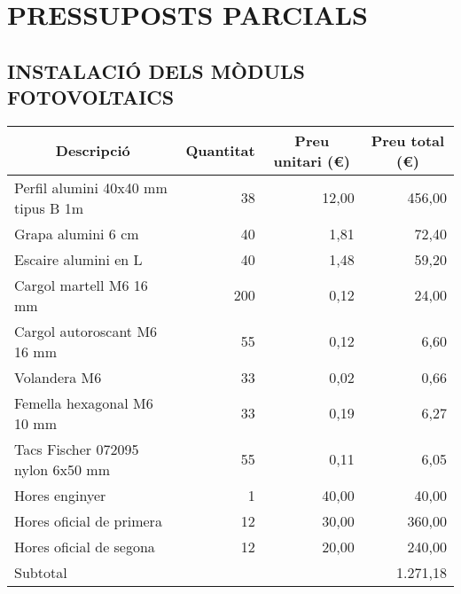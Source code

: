 \chapter{\uppercase{Pressuposts parcials}}

\section{\uppercase{Instal\Lgem ació dels mòduls fotovoltaics}}
\begin{table}[H]
  \begin{center}
    \begin{tabularx} {\textwidth} {|X|r|r|r|} \hline
  \multicolumn{1}{|c|}{Descripció} &  \multicolumn{1}{c|}{Quantitat} & \multicolumn{1}{c|}{Preu unitari (€)} &  \multicolumn{1}{c|}{Preu total (€)}\\ \hline \hline
    Perfil alumini 40x40 mm tipus B 1m & 38    & 12,00 & 456,00 \\ \hline
    Grapa alumini 6 cm & 40    & 1,81  & 72,40 \\ \hline
    Escaire alumini en L & 40    & 1,48  & 59,20 \\ \hline
    Cargol martell M6 16 mm & 200   & 0,12  & 24,00 \\ \hline
    Cargol autoroscant M6 16 mm & 55    & 0,12  & 6,60 \\ \hline
    Volandera M6 & 33    & 0,02  & 0,66 \\ \hline
    Femella hexagonal M6 10 mm & 33    & 0,19  & 6,27 \\ \hline
    Tacs Fischer 072095 nylon 6x50 mm & 55    & 0,11  & 6,05 \\ \hline
        Hores enginyer & 1     & 40,00 & 40,00 \\ \hline
    Hores oficial de primera & 12    & 30,00 & 360,00 \\ \hline
    Hores oficial de segona & 12    & 20,00 & 240,00 \\ \hline \hline
    \multicolumn{3}{|l}{Subtotal} & 1.271,18 \\ \hline

    \end{tabularx}%
  \end{center}

  \label{tab:addlabel}%
\end{table}%




